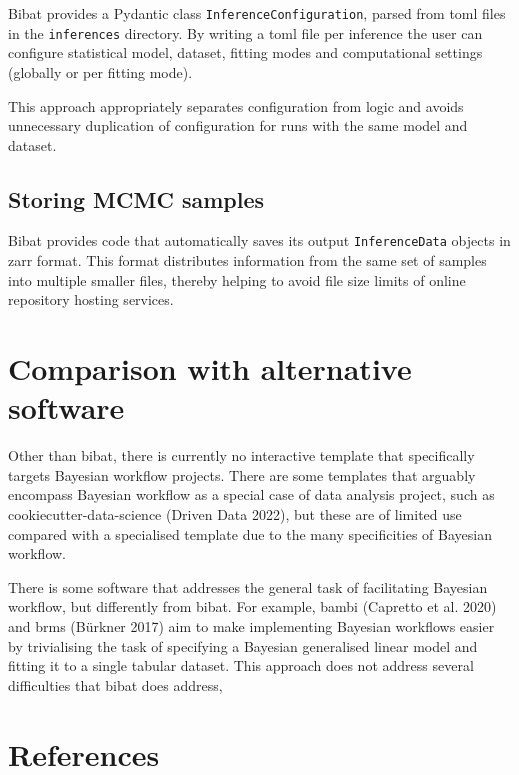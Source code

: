 \documentclass[
  letterpaper,
  DIV=11,
  numbers=noendperiod]{scrartcl}
\begin{document}
Bibat provides a Pydantic class \texttt{InferenceConfiguration}, parsed
from toml files in the \texttt{inferences} directory. By writing a toml
file per inference the user can configure statistical model, dataset,
fitting modes and computational settings (globally or per fitting mode).

This approach appropriately separates configuration from logic and
avoids unnecessary duplication of configuration for runs with the same
model and dataset.

\hypertarget{storing-mcmc-samples}{%
\subsection{Storing MCMC samples}\label{storing-mcmc-samples}}

Bibat provides code that automatically saves its output
\texttt{InferenceData} objects in zarr format. This format distributes
information from the same set of samples into multiple smaller files,
thereby helping to avoid file size limits of online repository hosting
services.

\hypertarget{comparison-with-alternative-software}{%
\section{Comparison with alternative
software}\label{comparison-with-alternative-software}}

Other than bibat, there is currently no interactive template that
specifically targets Bayesian workflow projects. There are some
templates that arguably encompass Bayesian workflow as a special case of
data analysis project, such as cookiecutter-data-science (Driven Data
2022), but these are of limited use compared with a specialised template
due to the many specificities of Bayesian workflow.

There is some software that addresses the general task of facilitating
Bayesian workflow, but differently from bibat. For example, bambi
(Capretto et al. 2020) and brms (Bürkner 2017) aim to make implementing
Bayesian workflows easier by trivialising the task of specifying a
Bayesian generalised linear model and fitting it to a single tabular
dataset. This approach does not address several difficulties that bibat
does address,

\hypertarget{references}{%
\section*{References}\label{references}}
\end{document}
